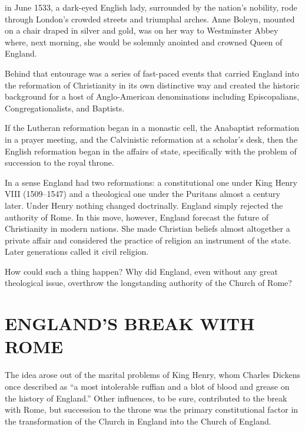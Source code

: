 
 in June 1533, a dark-eyed English lady, surrounded by the
nation’s nobility, rode through London’s crowded streets and triumphal arches. Anne Boleyn, mounted
on a chair draped in silver and gold, was on her way to Westminster Abbey where, next morning, she
would be solemnly anointed and crowned Queen of England.

Behind that entourage was a series of fast-paced events that carried England into the reformation of
Christianity in its own distinctive way and created the historic background for a host of
Anglo-American denominations including Episcopalians, Congregationalists, and Baptists.

If the Lutheran reformation began in a monastic cell, the Anabaptist reformation in a prayer
meeting, and the Calvinistic reformation at a scholar’s desk, then the English reformation began in
the affairs of state, specifically with the problem of succession to the royal throne.

In a sense England had two reformations: a constitutional one under King Henry VIII (1509–1547) and
a theological one under the Puritans almost a century later. Under Henry nothing changed
doctrinally. England simply rejected the authority of Rome. In this move, however, England forecast
the future of Christianity in modern nations. She made Christian beliefs almost altogether a private
affair and considered the practice of religion an instrument of the state. Later generations called
it civil religion.

How could such a thing happen? Why did England, even without any great theological issue, overthrow
the longstanding authority of the Church of Rome?

\section{ENGLAND’S BREAK WITH ROME}

The idea arose out of the marital problems of King Henry, whom Charles Dickens once described as “a
most intolerable ruffian and a blot of blood and grease on the history of England.” Other
influences, to be sure, contributed to the break with Rome, but succession to the throne was the
primary constitutional factor in the transformation of the Church in England into the Church of
England.


